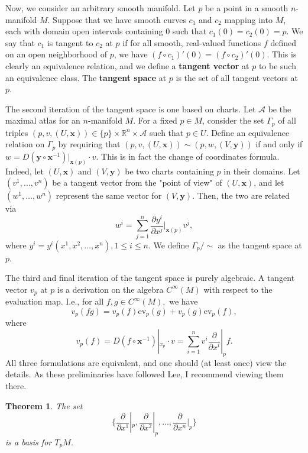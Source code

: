 \documentclass{article}
\newtheorem{theorem}{Theorem}[section]
\theoremstyle{definition}
\newcommand{\R}{\mathbb{R}}
\let\vec\mathbf
\begin{document}
Now, we consider an arbitrary smooth manifold.
Let $p$ be a point in a smooth $n$-manifold $M$. Suppose that we have smooth curves $c_{1}$ and $c_{2}$ mapping into $M$, each with domain open intervals containing 0 such that $c_{1}(0)=c_{2}(0)=p.$ We say that $c_{1}$ is tangent to $c_{2}$ at $p$ if for all smooth, real-valued functions $f$ defined on an open neighborhood of $p$, we have $(f\circ c_{1})'(0)=(f\circ c_{2})'(0).$ This is clearly an equivalence relation, and we define a \textbf{tangent vector} at $p$ to be such an equivalence class. The \textbf{tangent space} at $p$ is the set of all tangent vectors at $p$.

The second iteration of the tangent space is one based on charts. Let $\mathcal{A}$ be the maximal atlas for an $n$-manifold $M$. For a fixed $p\in M$, consider the set $\Gamma_{p}$ of all triples $(p,v,(U,\vec{x}))\in\{p\}\times\R^{n}\times\mathcal{A}$ such that $p\in U$. Define an equivalence relation on $\Gamma_{p}$ by requiring that $(p,v,(U,\vec{x}))\sim(p,w,(V,\vec{y}))$ if and only if $w=D(\vec{y}\circ\vec{x}^{-1})|_{\vec{x}(p)}\cdot v$. This is in fact the change of coordinates formula. Indeed, let $(U,\vec{x})$ and $(V,\vec{y})$ be two charts containing $p$ in their domains. Let $(v^{1},\dots,v^{n})$ be a tangent vector from the "point of view" of $(U,\vec{x})$, and let $(w^{1},\dots,w^{n})$ represent the same vector for $(V,\vec{y})$. Then, the two are related via
\[w^{i}=\sum_{j=1}^{n}\frac{\partial y^{i}}{\partial x^{j}}|_{\vec{x}(p)}v^{j}, \] where $y^{i}=y^{i}(x^{1},x^{2},\dots,x^{n}),1\leq i\leq n$. We define $\Gamma_{p}/\sim$ as the tangent space at $p$.

The third and final iteration of the tangent space is purely algebraic. A tangent vector $v_{p}$ at $p$ is a derivation on the algebra $C^{\infty}(M)$ with respect to the evaluation map. I.e., for all $f,g\in C^{\infty}(M),$ we have
\[v_{p}(fg)=v_{p}(f)\text{ev}_{p}(g)+v_{p}(g)\text{ev}_{p}(f), \] where \[v_{p}(f)=D(f\circ\vec{x}^{-1})|_{x_{p}}\cdot v=\sum_{i=1}^{n}v^{i}\frac{\partial}{\partial x^{i}}|_{p}f.\] All three formulations are equivalent, and one should (at least once) view the details. As these preliminaries have followed Lee\cite{Lee}, I recommend viewing them there. 

\begin{theorem}
The set
\[\{\frac{\partial}{\partial x^{1}}|_{p},\frac{\partial}{\partial x^{2}}|_{p},\dots,\frac{\partial}{\partial x^{n}}|_{p} \}\] is a basis for $T_{p}M$.
\end{theorem}
\end{document}
